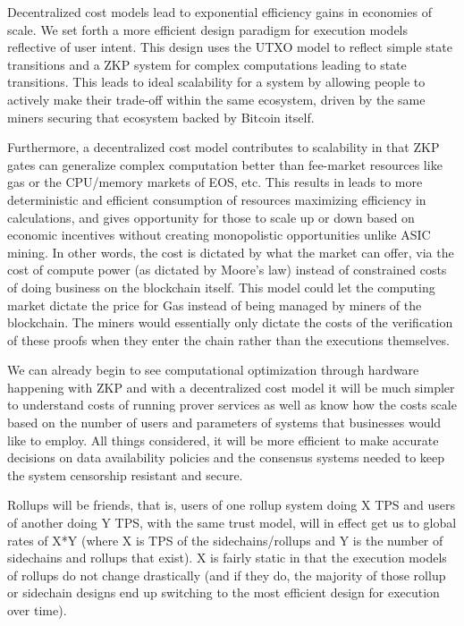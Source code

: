 \documentclass[peerreview]{ieeesyscoin}
\begin{document}
Decentralized cost models lead to exponential efficiency gains in economies of scale. We set forth a more efficient design paradigm for execution models reflective of user intent. This design uses the UTXO model to reflect simple state transitions and a ZKP system for complex computations leading to state transitions. This leads to ideal scalability for a system by allowing people to actively make their trade-off within the same ecosystem, driven by the same miners securing that ecosystem backed by Bitcoin itself.

Furthermore, a decentralized cost model contributes to scalability in that ZKP gates can generalize complex computation better than fee-market resources like gas or the CPU/memory markets of EOS, etc. This results in leads to more deterministic and efficient consumption of resources maximizing efficiency in calculations, and gives opportunity for those to scale up or down based on economic incentives without creating monopolistic opportunities unlike ASIC mining. In other words, the cost is dictated by what the market can offer, via the cost of compute power (as dictated by Moore's law) instead of constrained costs of doing business on the blockchain itself. This model could let the computing market dictate the price for Gas instead of being managed by miners of the blockchain. The miners would essentially only dictate the costs of the verification of these proofs when they enter the chain rather than the executions themselves.

We can already begin to see computational optimization through hardware happening with ZKP and with a decentralized cost model it will be much simpler to understand costs of running prover services as well as know how the costs scale based on the number of users and parameters of systems that businesses would like to employ. All things considered, it will be more efficient to make accurate decisions on data availability policies and the consensus systems needed to keep the system censorship resistant and secure.

Rollups will be friends, that is, users of one rollup system doing X TPS and users of another doing Y TPS, with the same trust model, will in effect get us to global rates of X*Y (where X is TPS of the sidechains/rollups and Y is the number of sidechains and rollups that exist). X is fairly static in that the execution models of rollups do not change drastically (and if they do, the majority of those rollup or sidechain designs end up switching to the most efficient design for execution over time).
\end{document}
